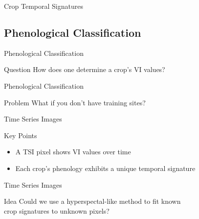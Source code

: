 \documentclass[draft,compress]{beamer}
\begin{document}
\begin{frame}{Crop Temporal Signatures}
\begin{figure}
  \centering
\end{figure}
\end{frame}

\subsection{Phenological Classification}
\begin{frame}{Phenological Classification}
\begingroup
{}
\begin{block}{Question}
  How does one determine a crop's VI values?
\end{block}
\endgroup
{}
\end{frame}

\begin{frame}{Phenological Classification}
\begin{alertblock}{Problem}
  What if you don’t have training sites?
\end{alertblock}
\end{frame}

\begin{frame}{Time Series Images}
\begin{block}{Key Points}
\begin{itemize}
  \item A TSI pixel shows VI values over time
  \item Each crop's phenology exhibits a unique temporal signature
\end{itemize}
\end{block}
\vspace{\baselineskip}
\centering
{}
\end{frame}

\begin{frame}{Time Series Images}
\begingroup
{}
\begin{block}{Idea}
  Could we use a hyperspectal-like method to fit known\\crop signatures to unknown pixels?
\end{block}
\endgroup
\end{frame}
\end{document}
